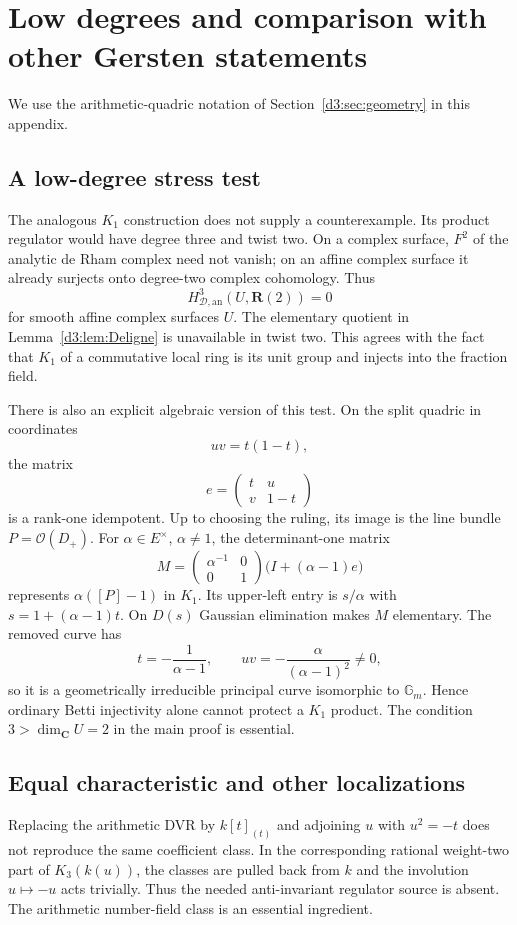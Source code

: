 \documentclass[11pt,a4paper]{amsart}
\numberwithin{equation}{section}
\theoremstyle{definition}
\theoremstyle{remark}
\newcommand{\R}{\mathbf R}
\newcommand{\C}{\mathbf C}
\newcommand{\OO}{\mathcal O}
\newcommand{\HD}{H_{\mathcal D,\mathrm{an}}}
\begin{document}
\section{Low degrees and comparison with other Gersten statements}\label{d3:sec:comparisons}
We use the arithmetic-quadric notation of Section~\ref{d3:sec:geometry} in this appendix.

\subsection{A low-degree stress test}
The analogous $K_1$ construction does not supply a counterexample. Its product regulator would have degree three and twist two. On a complex surface, $F^2$ of the analytic de Rham complex need not vanish; on an affine complex surface it already surjects onto degree-two complex cohomology. Thus
\[
\HD^3(U,\R(2))=0
\]
for smooth affine complex surfaces $U$. The elementary quotient in Lemma~\ref{d3:lem:Deligne} is unavailable in twist two. This agrees with the fact that $K_1$ of a commutative local ring is its unit group and injects into the fraction field.

There is also an explicit algebraic version of this test. On the split quadric in coordinates
\[
uv=t(1-t),
\]
the matrix
\[
e=\begin{pmatrix}t&u\\v&1-t\end{pmatrix}
\]
is a rank-one idempotent. Up to choosing the ruling, its image is the line bundle $P=\OO(D_+)$. For $\alpha\in E^\times$, $\alpha\neq1$, the determinant-one matrix
\[
M=\begin{pmatrix}\alpha^{-1}&0\\0&1\end{pmatrix}
\bigl(I+(\alpha-1)e\bigr)
\]
represents $\alpha([P]-1)$ in $K_1$. Its upper-left entry is $s/\alpha$ with $s=1+(\alpha-1)t$. On $D(s)$ Gaussian elimination makes $M$ elementary. The removed curve has
\[
t=-\frac1{\alpha-1},\qquad uv=-\frac{\alpha}{(\alpha-1)^2}\neq0,
\]
so it is a geometrically irreducible principal curve isomorphic to $\mathbb G_m$. Hence ordinary Betti injectivity alone cannot protect a $K_1$ product. The condition $3>\dim_{\C}U=2$ in the main proof is essential.

\subsection{Equal characteristic and other localizations}
Replacing the arithmetic DVR by $k[t]_{(t)}$ and adjoining $u$ with $u^2=-t$ does not reproduce the same coefficient class. In the corresponding rational weight-two part of $K_3(k(u))$, the classes are pulled back from $k$ and the involution $u\mapsto -u$ acts trivially. Thus the needed anti-invariant regulator source is absent. The arithmetic number-field class is an essential ingredient.
\end{document}
